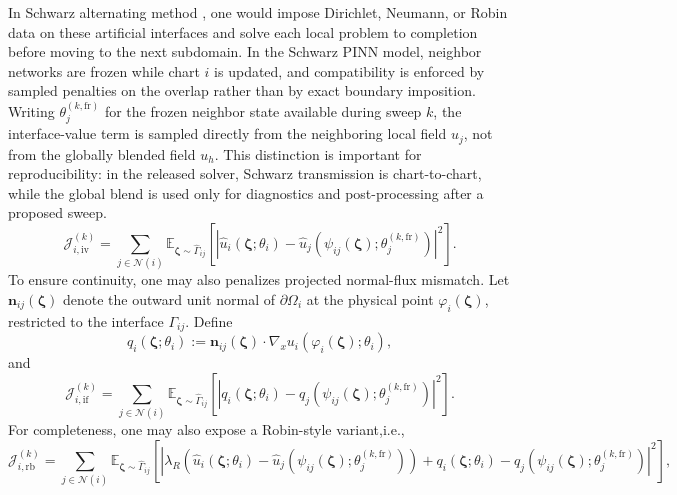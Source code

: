 \documentclass[sort&compress]{svjour3} %
\begin{document}
In Schwarz alternating method \citep{lions1988schwarz}, one would impose Dirichlet, Neumann, or Robin data on these artificial interfaces and solve each local problem to completion before moving to the next subdomain. In the Schwarz PINN model, 
 neighbor networks are frozen while chart $i$ is updated, and compatibility is enforced by sampled penalties on the overlap rather than by exact boundary imposition. Writing $\theta_j^{(k,\mathrm{fr})}$ for the frozen neighbor state available during sweep $k$, the interface-value term is
sampled directly from the neighboring local field $u_j$, not from the globally blended field $u_h$. This distinction is important for reproducibility: in the released solver, Schwarz transmission is chart-to-chart, while the global blend is used only for diagnostics and post-processing after a proposed sweep.
\begin{equation}
\mathcal{J}_{i,\mathrm{iv}}^{(k)}
=
\sum_{j\in \mathcal{N}(i)}
\mathbb{E}_{\boldsymbol{\zeta}\sim \widehat{\Gamma}_{ij}}
\left[
\left|
\widehat{u}_i(\boldsymbol{\zeta};\theta_i)
-
\widehat{u}_j\!\left(\psi_{ij}(\boldsymbol{\zeta});\theta_j^{(k,\mathrm{fr})}\right)
\right|^2
\right].
\label{eq:schwarz_iv_loss}
\end{equation}
To ensure continuity, one may also penalizes projected normal-flux mismatch. Let $\mathbf{n}_{ij}(\boldsymbol{\zeta})$ denote the outward unit normal of $\partial\Omega_i$ at the physical point $\varphi_i(\boldsymbol{\zeta})$, restricted to the interface $\Gamma_{ij}$. Define
\begin{equation}
q_i(\boldsymbol{\zeta};\theta_i)
:=
\mathbf{n}_{ij}(\boldsymbol{\zeta})\cdot
\nabla_x u_i\!\left(\varphi_i(\boldsymbol{\zeta});\theta_i\right),
\label{eq:schwarz_flux_trace}
\end{equation}
and
\begin{equation}
\mathcal{J}_{i,\mathrm{if}}^{(k)}
=
\sum_{j\in \mathcal{N}(i)}
\mathbb{E}_{\boldsymbol{\zeta}\sim \widehat{\Gamma}_{ij}}
\left[
\left|
q_i(\boldsymbol{\zeta};\theta_i)
-
q_j\!\left(\psi_{ij}(\boldsymbol{\zeta});\theta_j^{(k,\mathrm{fr})}\right)
\right|^2
\right].
\label{eq:schwarz_if_loss}
\end{equation}
For completeness, one may also expose a Robin-style variant,i.e.,
\begin{equation}
\mathcal{J}_{i,\mathrm{rb}}^{(k)}
=
\sum_{j\in \mathcal{N}(i)}
\mathbb{E}_{\boldsymbol{\zeta}\sim \widehat{\Gamma}_{ij}}
\left[
\left|
\lambda_R
\left(
\widehat{u}_i(\boldsymbol{\zeta};\theta_i)
-
\widehat{u}_j\!\left(\psi_{ij}(\boldsymbol{\zeta});\theta_j^{(k,\mathrm{fr})}\right)
\right)
+
q_i(\boldsymbol{\zeta};\theta_i)
-
q_j\!\left(\psi_{ij}(\boldsymbol{\zeta});\theta_j^{(k,\mathrm{fr})}\right)
\right|^2
\right],
\label{eq:schwarz_robin_loss}
\end{equation}
\end{document}
